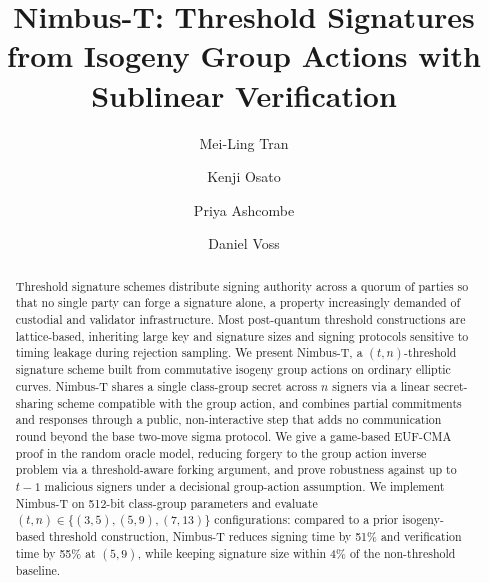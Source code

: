 \documentclass[runningheads]{llncs}
\begin{document}
\title{Nimbus-T: Threshold Signatures from Isogeny Group Actions with Sublinear Verification}

\author{Mei-Ling Tran \and Kenji Osato \and Priya Ashcombe \and Daniel Voss}


\maketitle


\begin{abstract}
Threshold signature schemes distribute signing authority across a quorum of parties so that no single party can forge a signature alone, a property increasingly demanded of custodial and validator infrastructure. Most post-quantum threshold constructions are lattice-based, inheriting large key and signature sizes and signing protocols sensitive to timing leakage during rejection sampling. We present Nimbus-T, a $(t,n)$-threshold signature scheme built from commutative isogeny group actions on ordinary elliptic curves. Nimbus-T shares a single class-group secret across $n$ signers via a linear secret-sharing scheme compatible with the group action, and combines partial commitments and responses through a public, non-interactive step that adds no communication round beyond the base two-move sigma protocol. We give a game-based EUF-CMA proof in the random oracle model, reducing forgery to the group action inverse problem via a threshold-aware forking argument, and prove robustness against up to $t-1$ malicious signers under a decisional group-action assumption. We implement Nimbus-T on 512-bit class-group parameters and evaluate $(t,n) \in \{(3,5),(5,9),(7,13)\}$ configurations: compared to a prior isogeny-based threshold construction, Nimbus-T reduces signing time by 51\% and verification time by 55\% at $(5,9)$, while keeping signature size within 4\% of the non-threshold baseline.
\end{abstract}











\end{document}

